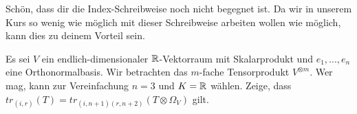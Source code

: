 \begin{sheet}
\begin{problem}[title={Was denn für Indizes?}]
	Schön, dass dir die Index-Schreibweise noch nicht begegnet ist. Da wir in unserem Kurs so wenig wie möglich mit dieser Schreibweise arbeiten wollen wie möglich, kann dies zu deinem Vorteil sein.
	
	Es sei $V$ ein endlich-dimensionaler $\mathbb{R}$-Vektorraum mit Skalarprodukt und $e_1, ..., e_n$ eine Orthonormalbasis. Wir betrachten das $m$-fache Tensorprodukt $V^{\otimes m}$. Wer mag, kann zur Vereinfachung $n=3$ und $K=\mathbb{R}$ wählen. Zeige, dass $tr_{(i,r)}(T)=tr_{(i,n+1)(r,n+2)}(T\otimes \Omega_V)$ gilt.
	
\end{problem}

\end{sheet}